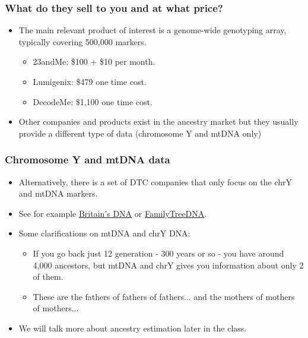 \documentclass{beamer}
\begin{document}
\begin{frame}
  \frametitle{What do they sell to you and at what price?}
   \begin{itemize}
   \item The main relevant product of interest is a genome-wide genotyping array, typically covering 500,000 markers.
     \begin{itemize}
     \item 23andMe: \$100 + \$10 per month.
     \item Lumigenix: \$479 one time cost.
     \item DecodeMe: \$1,100 one time cost.
     \end{itemize}
   \item Other companies and products exist in the ancestry market but they usually provide a different type of data (chromosome Y and mtDNA only)
   \end{itemize}
\end{frame}



\begin{frame}
  \frametitle{Chromosome Y and mtDNA data}
   \begin{itemize}
   \item Alternatively, there is a set of DTC companies that only focus on the chrY and mtDNA markers.
   \item See for example \href{http://www.britainsdna.com/}{Britain's DNA} or \href{http://www.familytreedna.com/}{FamilyTreeDNA}.
   \item Some clarifications on mtDNA and chrY DNA:
     \begin{itemize}
     \item If you go back just 12 generation - 300 years or so - you have around 4,000 ancestors, but mtDNA and chrY gives you information about only 2 of them.
     \item These are the fathers of fathers of fathers... and the mothers of mothers of mothers...
     \end{itemize}
   \item We will talk more about ancestry estimation later in the class.
   \end{itemize}
\end{frame}
\end{document}
